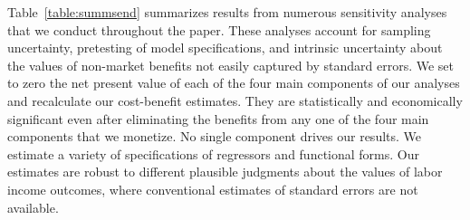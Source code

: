 Table~\ref{table:summsend} summarizes results from numerous sensitivity analyses that we conduct throughout the paper. These analyses account for sampling uncertainty, pretesting of model specifications, and intrinsic uncertainty about the values of non-market benefits not easily captured by standard errors. We set to zero the net present value of each of the four main components of our analyses and recalculate our cost-benefit estimates. They are statistically and economically significant even after eliminating the benefits from any one of the four main components that we monetize. No single component drives our results. We estimate a variety of specifications of regressors and functional forms. Our estimates are robust to different plausible judgments about the values of labor income outcomes, where conventional estimates of standard errors are not available.

